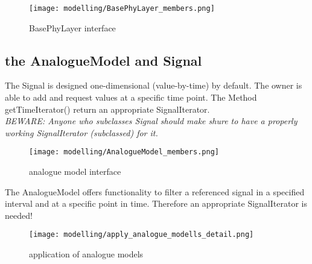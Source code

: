 \begin{figure}[h]
 \centering
 \texttt{[image: modelling/BasePhyLayer\_members.png]}
 \caption{BasePhyLayer interface}
 \label{fig: BasePhyLayer interface}
\end{figure}

\subsection{the AnalogueModel and Signal}


The Signal is designed one-dimensional (value-by-time) by default. The owner is able
to add and request values at a specific time point.
The Method getTimeIterator() return an appropriate SignalIterator.\\
\emph{BEWARE: Anyone who subclasses Signal should make shure to have a properly
working SignalIterator (subclassed) for it.}

\begin{figure}[h]
 \centering
 \texttt{[image: modelling/AnalogueModel\_members.png]}
 \caption{analogue model interface}
 \label{fig: analogue model interface}
\end{figure}

The AnalogueModel offers functionality to filter a referenced signal in a specified
interval and at a specific point in time. Therefore an appropriate SignalIterator is needed!

\begin{figure}[h]
 \centering
 \texttt{[image: modelling/apply\_analogue\_modells\_detail.png]}
 \caption{application of analogue models}
 \label{fig: application analogue models}
\end{figure}







